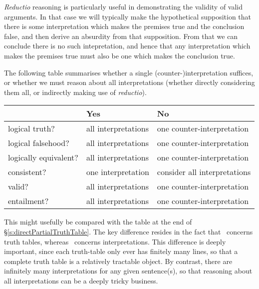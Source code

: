 \emph{Reductio} reasoning is particularly useful in demonstrating the validity of valid arguments. In that case we will typically make the hypothetical supposition that there is some interpretation which makes the premises true and the conclusion false, and then derive an absurdity from that supposition. From that we can conclude there is no such intepretation, and hence that any interpretation which makes the premises true must also be one which makes the conclusion true. 

The following table summarises whether a single (counter-)interpretation suffices, or whether we must reason about all interpretations (whether directly considering them all, or indirectly making use of \emph{reductio}).


\begin{center}
\begin{tabular}{l l l} \toprule 
 & \textbf{Yes} & \textbf{No}\\
 \midrule
logical truth? & all interpretations & one counter-interpretation\\
logical falsehood? &  all interpretations  & one counter-interpretation\\
logically equivalent? & all interpretations & one counter-interpretation\\
consistent? & one interpretation & consider all interpretations\\
valid? & all interpretations & one counter-interpretation\\
entailment? & all interpretations & one counter-interpretation\\
\bottomrule \end{tabular}
\end{center}
\label{table.ModelOrArgument}
This might usefully be compared with the table at the end of §\ref{s:directPartialTruthTable}. The key difference resides in the fact that \TFL\ concerns truth tables, whereas \FOL\ concerns interpretations. This difference is deeply important, since each truth-table only ever has finitely many lines, so that a complete truth table is a relatively tractable object. By contrast, there are infinitely many interpretations for any given sentence(s), so that reasoning about all interpretations can be a deeply tricky business. 


